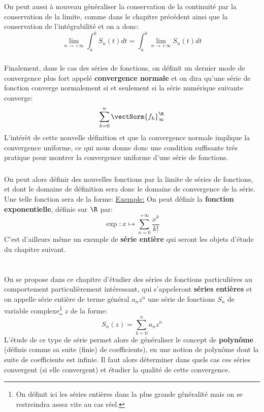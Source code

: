 On peut aussi à nouveau généraliser la conservation de la continuité par la conservation de la limite, comme dans le chapitre précédent ainsi que la conservation de l'intégrabilité et on a donc:
\[
   \lim_{n \rightarrow +\infty}\int_{a}^{b} S_n(t) d t = \int_{a}^{b} \lim_{n \rightarrow +\infty} S_n(t) d t
\]
\pagebreak
\subsection*{}
Finalement, dans le cas des séries de fonctions, on définit un dernier mode de convergence plus fort appelé \textbf{convergence normale} et on dira qu'une série de fonction converge normalement si et seulement si la série numérique suivante converge:
\[
   \sum_{k=0}^{n} \vectNorm{f_k}_\infty^\R   
\]
L'intérèt de cette nouvelle définition et que la convergence normale implique la convergence uniforme, ce qui nous donne donc une condition suffisante trés pratique pour montrer la convergence uniforme d'une série de fonctions.

\subsection*{}
On peut alors définir des nouvelles fonctions par la limite de séries de fonctions, et dont le domaine de définition sera donc le domaine de convergence de la série. Une telle fonction sera de la forme:
\underline{Exemple:} On peut définir la \textbf{fonction exponentielle}, définie sur \(\R\) par:
\[
   \exp: x \mapsto \sum_{n=0}^{+\infty} \frac{x^k}{k!}
\]
C'est d'ailleurs même un exemple de \textbf{série entière} qui seront les objets d'étude du chapitre suivant.
\chapter*{}
On se propose dans ce chapitre d'étudier des séries de fonctions particulières au comportement particulièrement intéressant, qui s'appeleront \textbf{séries entières} et on appelle série entière de terme général \(a_nz^n\) une série de fonctions \(S_n\) de variable complexe\footnote[1]{On définit ici les séries entières dans la plus grande généralité mais on se restreindra assez vite au cas réel.} \(z\) de la forme:
\[
   S_n(z) = \sum_{k=0}^{n} a_nz^n 
\]
L'étude de ce type de série permet alors de généraliser le concept de \textbf{polynôme} (définis comme sa suite (finie) de coefficients), en une notion de polynôme dont la suite de coefficients est infinie. Il faut alors déterminer dans quels cas ces séries convergent (si elle convergent) et étudier la qualité de cette convergence.

